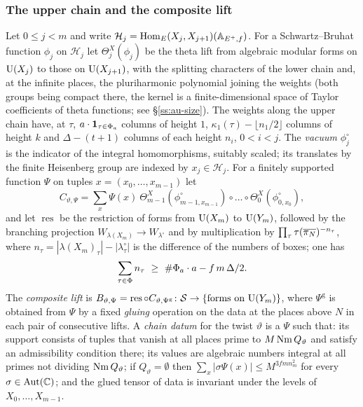 \documentclass[10pt]{amsart}
\theoremstyle{definition}
\theoremstyle{remark}
\newcommand{\C}{\mathbb C}
\begin{document}
\subsubsection*{The upper chain and the composite lift}
Let $0\le j<m$ and write $\mathcal H_j=\operatorname{Hom}_E(X_j,X_{j+1})(\mathbb A_{E^+,f})$. For a
Schwartz--Bruhat function $\phi_j$ on $\mathcal H_j$ let $\Theta^X_j(\phi_j)$ be the theta lift from algebraic
modular forms on $\mathrm U(X_j)$ to those on $\mathrm U(X_{j+1})$, with the splitting characters of the
lower chain and, at the infinite places, the pluriharmonic polynomial joining the weights
(both groups being compact there, the kernel is a finite-dimensional space of Taylor coefficients
of theta functions; see \S\ref{ss:au-size}). The weights along the upper chain have, at $\tau$,
$a\cdot\mathbf 1_{\tau\in\Phi_a}$ columns of height $1$, $\kappa_1(\tau)-\lfloor n_1/2\rfloor$
columns of height $k$ and $\Delta-(t+1)$ columns of each height $n_i$, $0<i<j$. The \emph{vacuum}
$\phi^\circ_j$ is the indicator of the integral homomorphisms, suitably scaled; its translates by
the finite Heisenberg group are indexed by $x_j\in\mathcal H_j$. For a
finitely supported function $\Psi$ on tuples $x=(x_0,\dots,x_{m-1})$ let
\[
C_{\vartheta,\Psi}=\sum_x\Psi(x)\ \Theta^X_{m-1}(\phi^\circ_{m-1,x_{m-1}})\circ\dots\circ
\Theta^X_0(\phi^\circ_{0,x_0}),
\]
and let $\operatorname{res}$ be the restriction of forms from $\mathrm U(X_m)$ to $\mathrm U(Y_m)$, followed
by the branching projection $W_{\lambda(X_m)}\to W_{\lambda^\circ}$ and by multiplication by
$\prod_\tau\tau(\overline{\pi_N})^{-n_\tau}$, where $n_\tau=|\lambda(X_m)_\tau|-|\lambda^\circ_\tau|$
is the difference of the numbers of boxes; one has
\begin{equation}\label{eq:au-branch}
\sum_{\tau\in\Phi}n_\tau\ \ge\ \#\Phi_a\cdot a-f\,m\,\Delta/2 .
\end{equation}
The \emph{composite lift} is $B_{\vartheta,\Psi}=\operatorname{res}\circ C_{\vartheta,\Psi^{\mathrm
g}}\colon\mathcal S\to\{\text{forms on }\mathrm U(Y_m)\}$, where $\Psi^{\mathrm g}$ is obtained from $\Psi$ by
a fixed \emph{gluing} operation on the data at the places above $N$ in each pair of consecutive
lifts. A \emph{chain datum} for the twist $\vartheta$ is a $\Psi$ such that: its support consists
of tuples that vanish at all places prime to $M\operatorname{Nm} Q_\vartheta$ and satisfy an admissibility
condition there; its values are algebraic numbers integral at all primes not dividing
$\operatorname{Nm} Q_\vartheta$; if $Q_\vartheta=\emptyset$ then $\sum_x|\sigma\Psi(x)|\le M^{3fmn_m^2}$ for
every $\sigma\in\auAut(\C)$; and the glued tensor of data is invariant under the levels of
$X_0,\dots,X_{m-1}$.
\end{document}

